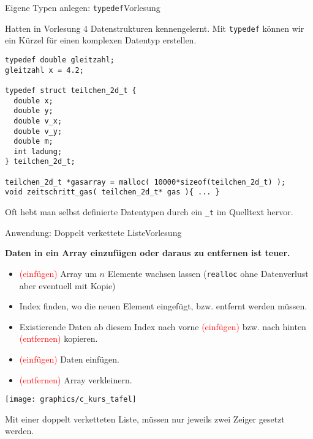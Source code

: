 \documentclass[xcolor=dvipsnames]{beamer}
\newcounter{lecturecounter}
\begin{document}

\begin{frame}[fragile]{Eigene Typen anlegen: \texttt{typedef}}{Vorlesung }
\begin{block}{}
  Hatten in Vorlesung 4 Datenstrukturen kennengelernt. Mit \texttt{typedef} können wir ein Kürzel für einen komplexen Datentyp erstellen.
\end{block}
\begin{lstlisting}
typedef double gleitzahl;
gleitzahl x = 4.2;

typedef struct teilchen_2d_t {
  double x;
  double y;
  double v_x;
  double v_y;
  double m;
  int ladung;
} teilchen_2d_t;

teilchen_2d_t *gasarray = malloc( 10000*sizeof(teilchen_2d_t) );
void zeitschritt_gas( teilchen_2d_t* gas ){ ... }
\end{lstlisting}
\begin{block}{}
  Oft hebt man selbst definierte Datentypen durch ein \texttt{\_t} im Quelltext hervor.
\end{block}
\end{frame}

\begin{frame}[fragile]{Anwendung: Doppelt verkettete Liste}{Vorlesung }
\begin{block}{}
  \textbf{Daten in ein Array einzufügen oder daraus zu entfernen ist teuer.}
  \begin{itemize}
    \item{\textcolor{red}{(einfügen)} Array um $n$ Elemente wachsen lassen (\verb|realloc| ohne Datenverlust aber eventuell mit Kopie)}
    \item{\hspace{1.5cm} Index finden, wo die neuen Element eingefügt, bzw. entfernt werden müssen.}
    \item{\hspace{1.5cm} Existierende Daten ab diesem Index nach vorne \textcolor{red}{(einfügen)} bzw. nach hinten \textcolor{red}{(entfernen)} kopieren.}
    \item{\textcolor{red}{(einfügen)} Daten einfügen.}
    \item{\textcolor{red}{(entfernen)} Array verkleinern.}
  \end{itemize}
\end{block}
\centering
\texttt{[image: graphics/c\_kurs\_tafel]}
\begin{block}{}
  Mit einer doppelt verketteten Liste, müssen nur jeweils zwei Zeiger gesetzt werden.
\end{block}
\end{frame}
\end{document}
